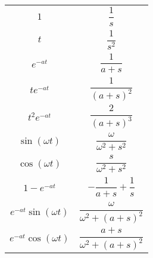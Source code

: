\begin{tabular}{ll}
\toprule
\midrule
$$1$$ & $$\frac{1}{s}$$ \\
$$t$$ & $$\frac{1}{s^{2}}$$ \\
$$e^{- a t}$$ & $$\frac{1}{a + s}$$ \\
$$t e^{- a t}$$ & $$\frac{1}{\left(a + s\right)^{2}}$$ \\
$$t^{2} e^{- a t}$$ & $$\frac{2}{\left(a + s\right)^{3}}$$ \\
$$\sin{\left(\omega t \right)}$$ & $$\frac{\omega}{\omega^{2} + s^{2}}$$ \\
$$\cos{\left(\omega t \right)}$$ & $$\frac{s}{\omega^{2} + s^{2}}$$ \\
$$1 - e^{- a t}$$ & $$- \frac{1}{a + s} + \frac{1}{s}$$ \\
$$e^{- a t} \sin{\left(\omega t \right)}$$ & $$\frac{\omega}{\omega^{2} + \left(a + s\right)^{2}}$$ \\
$$e^{- a t} \cos{\left(\omega t \right)}$$ & $$\frac{a + s}{\omega^{2} + \left(a + s\right)^{2}}$$ \\
\bottomrule
\end{tabular}

